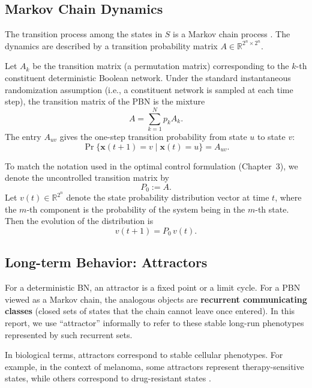 \documentclass[12pt, a4paper]{report}
\begin{document}
\subsection{Markov Chain Dynamics}
The transition process among the states in $S$ is a Markov chain process \cite{ching2009optimal}. The dynamics are described by a transition probability matrix $A \in \mathbb{R}^{2^n \times 2^n}$.

Let $A_k$ be the transition matrix (a permutation matrix) corresponding to the $k$-th constituent deterministic Boolean network. Under the standard instantaneous randomization assumption (i.e., a constituent network is sampled at each time step), the transition matrix of the PBN is the mixture
\begin{equation}
	A = \sum_{k=1}^{N} p_k A_k .
\end{equation}
The entry $A_{uv}$ gives the one-step transition probability from state $u$ to state $v$:
\begin{equation}
	\Pr\{\mathbf{x}(t+1) = v \mid \mathbf{x}(t) = u\} = A_{uv}.
\end{equation}

To match the notation used in the optimal control formulation (Chapter~3), we denote the uncontrolled transition matrix by
\begin{equation}
	P_0 := A .
\end{equation}
Let $v(t)\in\mathbb{R}^{2^n}$ denote the state probability distribution vector at time $t$, where the $m$-th component is the probability of the system being in the $m$-th state. Then the evolution of the distribution is
\begin{equation}
	v(t+1) = P_0\, v(t).
\end{equation}

\subsection{Long-term Behavior: Attractors}
For a deterministic BN, an attractor is a fixed point or a limit cycle. For a PBN viewed as a Markov chain, the analogous objects are \textbf{recurrent communicating classes} (closed sets of states that the chain cannot leave once entered). In this report, we use ``attractor'' informally to refer to these stable long-run phenotypes represented by such recurrent sets.

In biological terms, attractors correspond to stable cellular phenotypes. For example, in the context of melanoma, some attractors represent therapy-sensitive states, while others correspond to drug-resistant states \cite{liu2025melanoma}.
\end{document}
